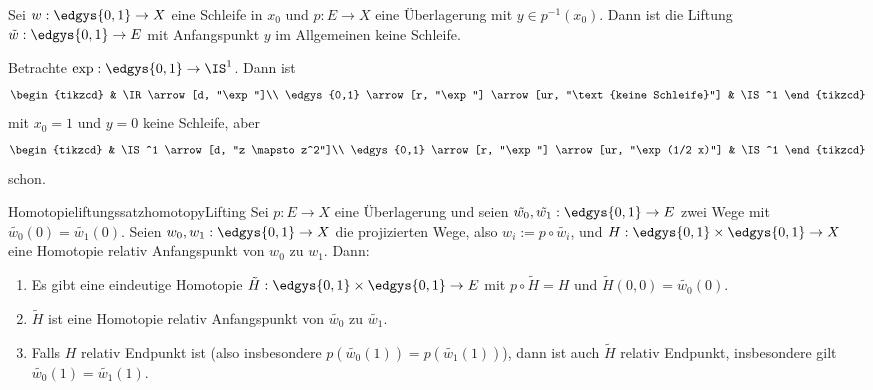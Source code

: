 \documentclass[language=ngerman]{TemplateLecture} %
\begin{document}
\begin{remark}
    Sei $w: \edgys{0,1} \to X$ eine Schleife in $x_0$ und $p: E \to X$ eine Überlagerung mit $y \in p^{-1}(x_0)$. Dann ist die Liftung $\tilde{w}: \edgys{0,1} \to E$ mit Anfangspunkt $y$ im Allgemeinen keine Schleife.
\end{remark}

\begin{example}
    Betrachte $\exp: \edgys{0,1} \to \IS^1$. Dann ist 
    \begin{equation*}
        \begin{tikzcd}
            & \IR \arrow[d, "\exp"]\\
            \edgys{0,1} \arrow[r, "\exp"] \arrow[ur, "\text{keine Schleife}"] & \IS^1
        \end{tikzcd}
    \end{equation*}
    mit $x_0 = 1$ und $y = 0$ keine Schleife, aber 
    \begin{equation*}
        \begin{tikzcd}
            & \IS^1 \arrow[d, "z \mapsto z^2"]\\
            \edgys{0,1} \arrow[r, "\exp"] \arrow[ur, "\exp(1/2 x)"] & \IS^1
        \end{tikzcd}
    \end{equation*}
    schon.
\end{example}


\begin{thm}{Homotopieliftungssatz}{homotopyLifting}
    Sei $p: E \to X$ eine Überlagerung und seien $\tilde{w_0}, \tilde{w_1}: \edgys{0,1} \to E$ zwei Wege mit $\tilde{w_0}(0) = \tilde{w_1}(0)$. Seien $w_0, w_1: \edgys{0,1} \to X$ die projizierten Wege, also $w_i := p \circ \tilde{w_i}$, und $H: \edgys{0,1} \times \edgys{0,1} \to X$ eine Homotopie relativ Anfangspunkt von $w_0$ zu $w_1$. Dann:
    \begin{enumerate}[$(i)$]
        \item Es gibt eine eindeutige Homotopie $\tilde{H}: \edgys{0,1} \times \edgys{0,1} \to E$ mit $p \circ \tilde{H} = H$ und $\tilde{H}(0,0) = \tilde{w_0}(0)$.
        \item $\tilde{H}$ ist eine Homotopie relativ Anfangspunkt von $\tilde{w_0}$ zu $\tilde{w_1}$.
        \item Falls $H$ relativ Endpunkt ist (also insbesondere $p(\tilde{w_0}(1)) = p(\tilde{w_1}(1))$), dann ist auch $\tilde{H}$ relativ Endpunkt, insbesondere gilt $\tilde{w_0}(1) = \tilde{w_1}(1)$.
    \end{enumerate}
\end{thm}
\end{document}
